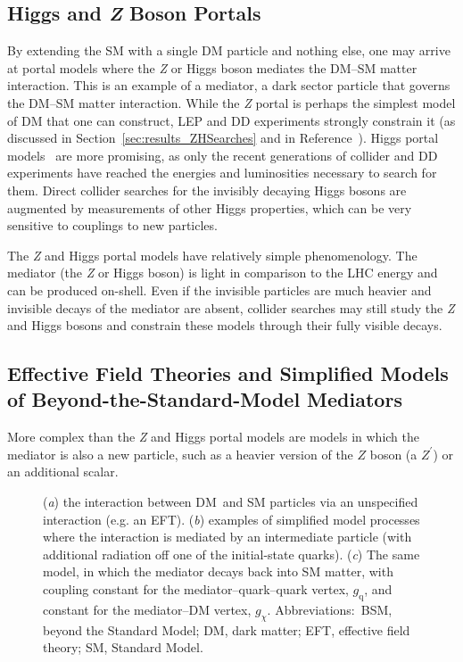 \documentclass{ar-1col}
\newcommand{\chiDM}{\ensuremath{\chi}\xspace}
\newcommand{\IP}{invisible particle}
\newcommand{\gDM}{\ensuremath{g_{\chiDM}}\xspace}
\newcommand{\gdm}{\gDM}
\newcommand{\gq}{$g_{\mathrm{q}}$\xspace}
\begin{document}
\subsection{Higgs and {\bf \it{Z}} Boson Portals}\label{sec:HZPortalModels}

By extending the SM with a single DM particle and nothing else, one
may arrive at portal models where the \textit{Z} or Higgs boson mediates
the DM--SM matter interaction. This is an example of a {mediator}, a dark sector particle that governs the DM--SM
matter interaction. While the {\textit{Z} portal} is perhaps the simplest
model of DM that one can construct, LEP and DD
experiments strongly constrain it (as discussed in
Section~\ref{sec:results_ZHSearches} and
in Reference~). {Higgs portal}
models~\cite{Patt:2006fw,Djouadi:2011aa} are more promising, as
only the recent generations of collider and DD
experiments have reached the energies and luminosities necessary to
search for them. Direct collider searches for the
invisibly decaying Higgs bosons are augmented by measurements of
other Higgs properties, which can be very sensitive to couplings
to new particles.

The \textit{Z} and Higgs portal models have relatively simple
phenomenology. The mediator (the \textit{Z} or Higgs boson) is light in
comparison to the LHC energy and can be produced on-shell. Even if
the {\IP}s are much heavier and invisible decays of the mediator
are absent, collider searches may still study the \textit{Z} and Higgs bosons and
constrain these models through their fully visible decays.

\subsection{Effective Field Theories and Simplified Models of Beyond-the-Standard-Model Mediators}\label{sec:BSMMediatorModels}

More complex than the \textit{Z} and Higgs portal
models are models in which the mediator is also a new particle, such
as a heavier version of the $Z$ boson (a $Z^\prime$) or an
additional scalar.

\begin{figure}[!htpb]
\caption{(\textit{a}) the interaction between DM\ and SM particles via an unspecified interaction (e.g. an EFT).
(\textit{b}) examples of simplified model processes where the interaction is mediated by an intermediate particle (with additional radiation off one of the initial-state quarks). 
(\textit{c}) The same model, in which  the mediator decays back into SM matter, with coupling constant for the mediator--quark--quark vertex, \gq, and constant for the mediator--DM vertex, \gdm. 
Abbreviations:\ BSM, beyond the Standard Model; DM, dark matter; EFT, effective field theory; SM, Standard Model. }
\label{fig:feynman_0}
\end{figure}
\end{document}
